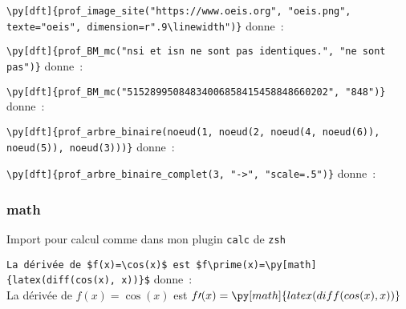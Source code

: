 \documentclass{article}
\begin{document}
\medskip
\verb|\py[dft]{prof_image_site("https://www.oeis.org", "oeis.png", texte="oeis", dimension=r".9\linewidth")}| donne~:\\

\medskip
\verb|\py[dft]{prof_BM_mc("nsi et isn ne sont pas identiques.", "ne sont pas")}| donne~:\\

\medskip
\verb|\py[dft]{prof_BM_mc("51528995084834006858415458848660202", "848")}| donne~:\\

\medskip
\verb|\py[dft]{prof_arbre_binaire(noeud(1, noeud(2, noeud(4, noeud(6)), noeud(5)), noeud(3)))}| donne~:\\

\medskip
\verb|\py[dft]{prof_arbre_binaire_complet(3, "->", "scale=.5")}| donne~:\\


\subsubsection{math}

Import pour calcul comme dans mon plugin \texttt{calc} de \texttt{zsh}

\verb|La dérivée de $f(x)=\cos(x)$ est $f\prime(x)=\py[math]{latex(diff(cos(x), x))}$| donne~:\\
La dérivée de $f(x)=\cos(x)$ est $f\prime(x)=\py[math]{latex(diff(cos(x), x))}$



\end{document}
